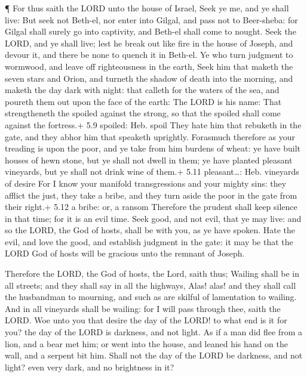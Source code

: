  ¶ For thus saith the LORD unto the house of Israel, Seek ye
me, and ye shall live:  But seek not Beth-el, nor enter into
Gilgal, and pass not to Beer-sheba: for Gilgal shall surely go into
captivity, and Beth-el shall come to nought.  Seek the LORD,
and ye shall live; lest he break out like fire in the house of Joseph,
and devour it, and there be none to quench it in Beth-el. 
Ye who turn judgment to wormwood, and leave off righteousness in the
earth,  Seek him that maketh the seven stars and Orion, and
turneth the shadow of death into the morning, and maketh the day dark
with night: that calleth for the waters of the sea, and poureth them out
upon the face of the earth: The LORD is his name:  That
strengtheneth the spoiled against the strong, so that the spoiled shall
come against the fortress.+ 5.9 spoiled: Heb. spoil  They
hate him that rebuketh in the gate, and they abhor him that speaketh
uprightly.  Forasmuch therefore as your treading is upon
the poor, and ye take from him burdens of wheat: ye have built houses of
hewn stone, but ye shall not dwell in them; ye have planted pleasant
vineyards, but ye shall not drink wine of them.+ 5.11 pleasant\ldots:
Heb. vineyards of desire  For I know your manifold
transgressions and your mighty sins: they afflict the just, they take a
bribe, and they turn aside the poor in the gate from their right.+ 5.12
a bribe: or, a ransom  Therefore the prudent shall keep
silence in that time; for it is an evil time.  Seek good,
and not evil, that ye may live: and so the LORD, the God of hosts, shall
be with you, as ye have spoken.  Hate the evil, and love
the good, and establish judgment in the gate: it may be that the LORD
God of hosts will be gracious unto the remnant of Joseph.

 Therefore the LORD, the God of hosts, the Lord, saith
thus; Wailing shall be in all streets; and they shall say in all the
highways, Alas! alas! and they shall call the husbandman to mourning,
and such as are skilful of lamentation to wailing.  And in
all vineyards shall be wailing: for I will pass through thee, saith the
LORD.  Woe unto you that desire the day of the LORD! to
what end is it for you? the day of the LORD is darkness, and not light.
 As if a man did flee from a lion, and a bear met him; or
went into the house, and leaned his hand on the wall, and a serpent bit
him.  Shall not the day of the LORD be darkness, and not
light? even very dark, and no brightness in it?

